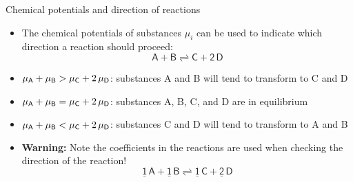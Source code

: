 %
\begin{frame}{Chemical potentials and direction of reactions}

\begin{itemize}[<+->]
\item The chemical potentials of substances $\mu_{i}$ can be used to
indicate which direction a reaction should proceed: 
\[
\mathsf{A+B\rightleftharpoons C+2\,D}
\]
\item $\mu_{\sf A}+\mu_{\sf B}>\mu_{\sf C}+2\,\mu_{\sf D}$: substances A and B will
tend to transform to C and D
\item $\mu_{\sf A}+\mu_{\sf B}=\mu_{\sf C}+2\,\mu_{\sf D}$: substances A, B, C,
and D are in equilibrium 
\item $\mu_{\sf A}+\mu_{\sf B}<\mu_{\sf C}+2\,\mu_{\sf D}$: substances C and D will
tend to transform to A and B
\item \alert{\bf Warning:} Note the coefficients in the reactions are used
when checking the direction of the reaction!
\[
\mathsf{\underline{1}\,A+\underline{1}\,B\rightleftharpoons\underline{1}\,C+\underline{2}\,D}
\]
\end{itemize}
\end{frame}
%
%

